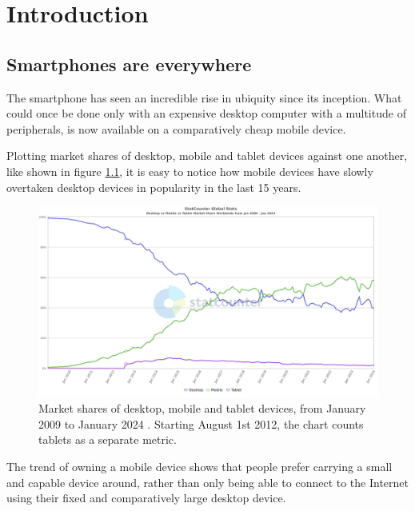 \chapter{Introduction}


\section{Smartphones are everywhere}

The smartphone has seen an incredible rise in ubiquity since its inception. What could once be done only with an expensive desktop computer with a multitude of peripherals, is now available on a comparatively cheap mobile device.

Plotting market shares of desktop, mobile and tablet devices against one another, like shown in figure \ref{FigStatCounterDMT}, it is easy to notice how mobile devices have slowly overtaken desktop devices in popularity in the last 15 years.

\begin{figure}[htbp]
    \centering
    \includegraphics[width=\textwidth]{./figures/ch1_desktop-vs-mobile.png}
    \caption{Market shares of desktop, mobile and tablet devices, from January 2009 to January 2024 \cite{StatCountDMT}. Starting August 1st 2012, the chart counts tablets as a separate metric.}
    \label{FigStatCounterDMT}
\end{figure}

The trend of owning a mobile device shows that people prefer carrying a small and capable device around, rather than only being able to connect to the Internet using their fixed and comparatively large desktop device.

